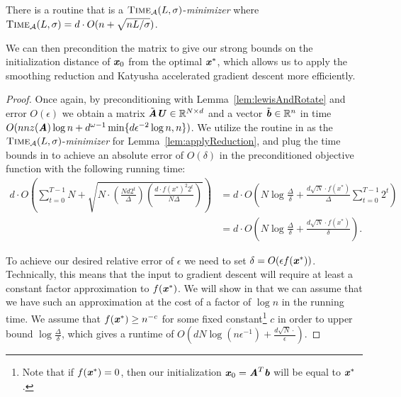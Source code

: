\begin{theorem}\label{thm:katyushaRuntime}
	There is a routine that is a $\textsc{Time}_\calA(L,\sigma)$-\textit{minimizer} where $\textsc{Time}_\calA(L,\sigma) = d \cdot O(n + \sqrt{nL/\sigma})$.
\end{theorem}

We can then precondition the matrix to give our strong bounds on the initialization distance of $\xx_0$ from the optimal $\xx^*$, which allows us to apply the smoothing reduction and Katyusha accelerated gradient descent more efficiently. 

\applyKatyusha*
\begin{proof}	
	Once again, by preconditioning with Lemma~\ref{lem:lewisAndRotate} and error $O(\epsilon)$ we obtain a matrix $\tilde{\AA}\UU \in \R^{N \times d}$ and a vector $\tilde{\bb} \in \R^n$ in time $O(nnz(\AA)\log{n} + d^{\omega-1}\min\{d\epsilon^{-2}\log{n},n\})$.
	We utilize the routine in  as the $\textsc{Time}_\calA(L,\sigma)$-\textit{minimizer} for Lemma~\ref{lem:applyReduction}, and plug the time bounds in to achieve an absolute error of $O(\delta)$ in the preconditioned objective function with the following running time:
	\begin{align*} 
	d \cdot O\left( \sum_{t=0}^{T-1}N + \sqrt{N\cdot\left(\frac{Nd 2^{t}}{\Delta}\right)\left(\frac{d\cdot f(x^*)^2 2^{t}}{N\Delta}\right)}\right) 
	&= d \cdot O\left( N\log{\frac{\Delta}{\delta}} +  \frac{d\sqrt{N}\cdot f(x^*)}{\Delta}\sum_{t=0}^{T-1} 2^{t}\right) \\ &= d \cdot O\left( N\log{\frac{\Delta}{\delta}} + \frac{d\sqrt{N}\cdot f(x^*)}{\delta}\right) .
	\end{align*}

	To achieve our desired relative error of $\epsilon$ we need to set $\delta = O(\epsilon f(\xx^*))$. Technically, this means that the input to gradient descent will require at least a constant factor approximation to $f(\xx^*)$. We will show in  that we can assume that we have such an approximation at the cost of a factor of $\log{n}$ in the running time. We assume that $f(\xx^*) \geq n^{-c}$ for some fixed constant\footnote{Note that if $f(\xx^*) = 0$, then our initialization $\xx_0 = \AA^T \bb$ will be equal to $\xx^*$.} $c$ in order to upper bound $\log\frac{\Delta}{\delta}$, which gives a runtime of $O\left(d N\log (n\epsilon^{-1}) + \frac{d\sqrt{N}\cdot }{\epsilon}\right)$.
		

\end{proof}
